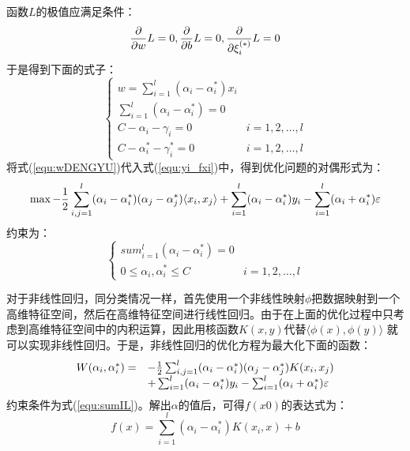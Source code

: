 函数$L$的极值应满足条件：
$$
{\partial \over \partial w }L = 0,
{\partial \over \partial b }L = 0,
{\partial \over \partial \xi _i^{(*)}}L = 0
$$
于是得到下面的式子：
\begin{equation}
\label{equ:wDENGYU}
	\left\lbrace 
		\begin{array}{ll}
		w = \sum_{i=1}^{l}(\alpha_i -\alpha_i^*) x_i &  {}  \\
		\sum_{i=1}^{l}(\alpha_i -\alpha_i^*) = 0 &  {}\\
		C-\alpha_i-\gamma_i = 0 &  i=1,2,\dots,l\\
		C-\alpha_i^*-\gamma_i^* = 0 & i=1,2,\dots,l
		\end{array}
	\right. 
\end{equation}
将式(\ref{equ:wDENGYU})代入式(\ref{equ:yi_fxi})中，得到优化问题的对偶形式为：
\begin{equation}
	\max -{1\over 2} \sum_{i,j=1}^{l}(\alpha_i-\alpha_i^*)(\alpha_j-\alpha_j^*)
	\langle x_i,x_j \rangle	+\sum_{i=1}^{l}(\alpha_i-\alpha_i^*)y_i
	-\sum_{i=1}^{l}(\alpha_i+\alpha_i^*)\varepsilon
\end{equation}
约束为：
\begin{equation}
\label{equ:sumIL}
	\left\lbrace 
		\begin{array}{ll}
		 sum_{i=1}^{l} (\alpha_i - \alpha_i^*) = 0&  {}  \\
		0\leqslant \alpha_i,\alpha_i^* \leqslant C & i=1,2,\dots,l
		\end{array}
	\right. 
\end{equation}

对于非线性回归，同分类情况一样，首先使用一个非线性映射$\phi$把数据映射到一个高维特征空间，然后在高维特征空间进行线性回归。由于在上面的优化过程中只考虑到高维特征空间中的内积运算，因此用核函数$K(x,y)$代替$\langle \phi(x),\phi(y)  \rangle$ 就可以实现非线性回归。于是，非线性回归的优化方程为最大化下面的函数：
\begin{equation}
	\begin{array}{cl}
	W(\alpha_i,\alpha_i^*) = & -{1\over 2} \sum_{i,j=1}^{l}(\alpha_i-\alpha_i^*)(\alpha_j-\alpha_j^*)K(x_i,x_j)\\
	{} & +\sum_{i=1}^{l}(\alpha_i-\alpha_i^*)y_i - \sum_{i=1}^{l}(\alpha_i+\alpha_i^*)\varepsilon
	\end{array}
\end{equation}
约束条件为式(\ref{equ:sumIL})。解出$\alpha$的值后，可得$f(x0)$的表达式为：
\begin{equation}
	f(x) = \sum_{i=1}^{l}(\alpha_i-\alpha_i^*)K(x_i,x) + b
\end{equation}

